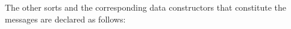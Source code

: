 \documentclass[a4paper,fleqn]{cas-dc}
\begin{document}
The other sorts and the corresponding data
constructors that constitute the messages are declared as follows:
\end{document}
